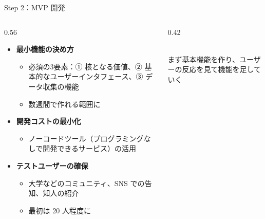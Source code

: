 \documentclass[aspectratio=169]{beamer}
\begin{document}
\begin{frame}{Step 2：MVP 開発}
\begin{columns}[T]
\begin{column}{0.56\textwidth}
\small
\begin{itemize}
  \item \textbf{最小機能の決め方}
  \begin{itemize}\footnotesize
    \item 必須の3要素：① 核となる価値、② 基本的なユーザーインタフェース、③ データ収集の機能
    \item 数週間で作れる範囲に
  \end{itemize}
  \item \textbf{開発コストの最小化}
  \begin{itemize}\footnotesize
    \item ノーコードツール（プログラミングなしで開発できるサービス）の活用
  \end{itemize}
  \item \textbf{テストユーザーの確保}
  \begin{itemize}\footnotesize
    \item 大学などのコミュニティ、SNS での告知、知人の紹介
    \item 最初は 20 人程度に
  \end{itemize}
\end{itemize}
\end{column}
\begin{column}{0.42\textwidth}
\\[0.3em]
{\footnotesize\color{winter} まず基本機能を作り、ユーザーの反応を見て機能を足していく}
\end{column}
\end{columns}
\end{frame}
\end{document}
